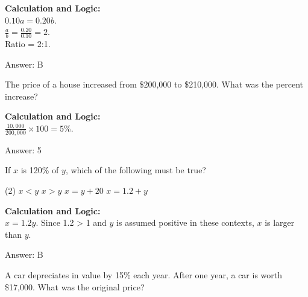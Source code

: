 \documentclass[11pt,paper=a4,answers]{exam}
\begin{document}
\begin{questions}
\begin{solution}
\textbf{Calculation and Logic:} \\
$0.10a = 0.20b$. \\
$\frac{a}{b} = \frac{0.20}{0.10} = 2$. \\
Ratio = 2:1.

\vspace{30pt}

Answer: \colorbox{yellow!100}{B}
\end{solution}

\vspace{60pt}

\question
The price of a house increased from \$200,000 to \$210,000. What was the percent increase?

\begin{solution}
\textbf{Calculation and Logic:} \\
$\frac{10,000}{200,000} \times 100 = 5\%$.

\vspace{30pt}

Answer: \colorbox{yellow!100}{5}
\end{solution}

\vspace{60pt}

\question
If $x$ is 120\% of $y$, which of the following must be true?
\begin{tasks}(2)
    \task $x < y$
    \task $x > y$
    \task $x = y + 20$
    \task $x = 1.2 + y$
\end{tasks}

\begin{solution}
\textbf{Calculation and Logic:} \\
$x = 1.2y$. Since 1.2 > 1 and $y$ is assumed positive in these contexts, $x$ is larger than $y$.

\vspace{30pt}

Answer: \colorbox{yellow!100}{B}
\end{solution}

\vspace{60pt}

\question
A car depreciates in value by 15\% each year. After one year, a car is worth \$17,000. What was the original price?


\end{questions}
\end{document}
